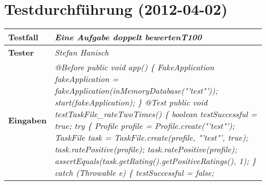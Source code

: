 
\chapter{Testdurchführung (2012-04-02)}



\begin{longtable}{|p{4cm}|p{11cm}|}
\hline
\textbf{Testfall} & \textit{Eine Aufgabe doppelt bewerten\textbf{T100}} \\
\hline
\textbf{Tester} & \textit{Stefan Hanisch} \\
\hline
\textbf{Eingaben} & \textit{@Before \newline
public void app() \{ \newline
\hspace*{1mm}FakeApplication fakeApplication \newline
\hspace*{4mm}= fakeApplication(inMemoryDatabase("'test"'));\newline
\hspace*{1mm}start(fakeApplication); \newline
\} \newline
\newline
@Test \newline
public void testTaskFile\_rateTwoTimes() \{\newline
\hspace*{1mm}boolean testSuccessful = true; \newline
\hspace*{1mm}try \{\newline
\hspace*{3mm}Profile profile = Profile.create("'test"');\newline
\hspace*{3mm}TaskFile task = TaskFile.create(profile, "'test"', true);\newline
\hspace*{3mm}task.ratePositive(profile);\newline
\hspace*{3mm}task.ratePositive(profile);\newline
\hspace*{3mm}assertEquals(task.getRating().getPositiveRatings(), 1);\newline
\hspace*{1mm}\} catch (Throwable e) \{ \newline
\hspace*{3mm}testSuccessful = false; \newline 
}
\end{longtable}
